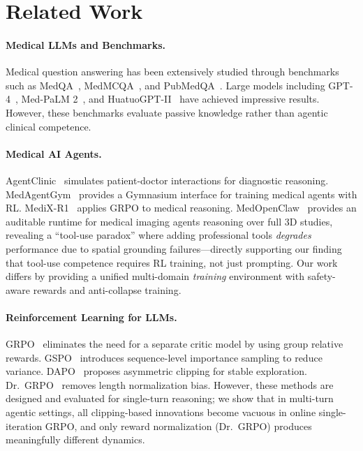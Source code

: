 \documentclass{article}
\begin{document}
\section{Related Work}
\label{sec:related}

\paragraph{Medical LLMs and Benchmarks.}
Medical question answering has been extensively studied through benchmarks such as MedQA~\citep{jin2021medqa}, MedMCQA~\citep{pal2022medmcqa}, and PubMedQA~\citep{jin2019pubmedqa}. Large models including GPT-4~\citep{nori2023gpt4}, Med-PaLM 2~\citep{singhal2023medpalm2}, and HuatuoGPT-II~\citep{chen2024huatuogpt} have achieved impressive results. However, these benchmarks evaluate passive knowledge rather than agentic clinical competence.

\paragraph{Medical AI Agents.}
AgentClinic~\citep{schmidgall2025agentclinic} simulates patient-doctor interactions for diagnostic reasoning. MedAgentGym~\citep{medagentgym2026} provides a Gymnasium interface for training medical agents with RL. MediX-R1~\citep{medixr1} applies GRPO to medical reasoning. MedOpenClaw~\citep{shen2025medopenclaw} provides an auditable runtime for medical imaging agents reasoning over full 3D studies, revealing a ``tool-use paradox'' where adding professional tools \emph{degrades} performance due to spatial grounding failures---directly supporting our finding that tool-use competence requires RL training, not just prompting. Our work differs by providing a unified multi-domain \emph{training} environment with safety-aware rewards and anti-collapse training.

\paragraph{Reinforcement Learning for LLMs.}
GRPO~\citep{shao2024deepseekmath} eliminates the need for a separate critic model by using group relative rewards. GSPO~\citep{gspo2025} introduces sequence-level importance sampling to reduce variance. DAPO~\citep{dapo2025} proposes asymmetric clipping for stable exploration. Dr.~GRPO~\citep{liu2025drgrpo} removes length normalization bias. However, these methods are designed and evaluated for single-turn reasoning; we show that in multi-turn agentic settings, all clipping-based innovations become vacuous in online single-iteration GRPO, and only reward normalization (Dr.~GRPO) produces meaningfully different dynamics.
\end{document}
